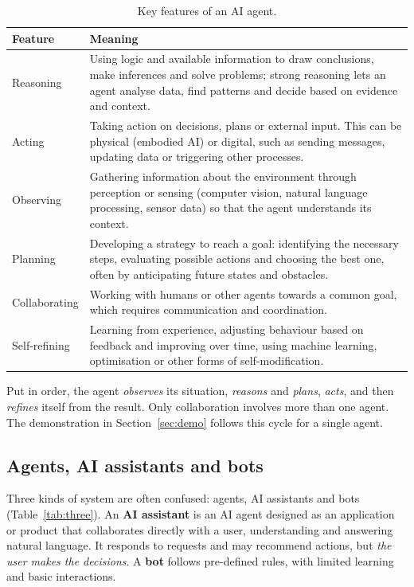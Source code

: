 \documentclass[11pt, a4paper]{article}
\begin{document}
\begin{table}[H]
\centering
\small
\caption{Key features of an AI agent.}
\label{tab:features}
\begin{tabularx}{\textwidth}{l X}
\toprule
Feature & Meaning \\
\midrule
Reasoning & Using logic and available information to draw conclusions, make inferences and solve problems; strong reasoning lets an agent analyse data, find patterns and decide based on evidence and context. \\
Acting & Taking action on decisions, plans or external input. This can be physical (embodied AI) or digital, such as sending messages, updating data or triggering other processes. \\
Observing & Gathering information about the environment through perception or sensing (computer vision, natural language processing, sensor data) so that the agent understands its context. \\
Planning & Developing a strategy to reach a goal: identifying the necessary steps, evaluating possible actions and choosing the best one, often by anticipating future states and obstacles. \\
Collaborating & Working with humans or other agents towards a common goal, which requires communication and coordination. \\
Self-refining & Learning from experience, adjusting behaviour based on feedback and improving over time, using machine learning, optimisation or other forms of self-modification. \\
\bottomrule
\end{tabularx}
\end{table}

Put in order, the agent \emph{observes} its situation, \emph{reasons} and \emph{plans}, \emph{acts}, and then \emph{refines} itself from the result. Only collaboration involves more than one agent. The demonstration in Section~\ref{sec:demo} follows this cycle for a single agent.

\subsection{Agents, AI assistants and bots}

Three kinds of system are often confused: agents, AI assistants and bots (Table~\ref{tab:three}). An \textbf{AI assistant} is an AI agent designed as an application or product that collaborates directly with a user, understanding and answering natural language. It responds to requests and may recommend actions, but \emph{the user makes the decisions}. A \textbf{bot} follows pre-defined rules, with limited learning and basic interactions.
\end{document}
